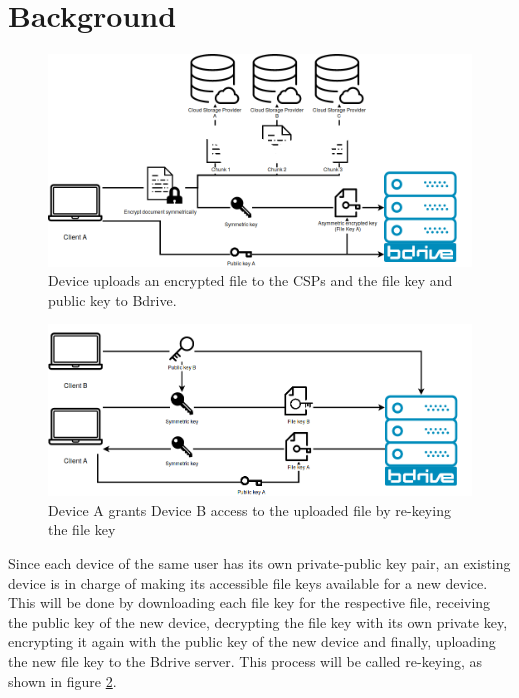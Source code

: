 \section{Background}
\label{sec:background}
\begin{figure}[!ht]
\centering
    \includegraphics[width=1\linewidth]{img/bdrive1.png}\par 
    \caption{Device uploads an encrypted file to the \ac{CSP}s and the file key and public key to Bdrive.}
    \label{fig:filekey}
\end{figure}
\begin{figure}[!ht]
\centering
    \includegraphics[width=1\linewidth]{img/bdrive2.png}\par
    \caption{Device A grants Device B access to the uploaded file by re-keying the file key}
    \label{fig:rekey}
\end{figure}
Since each device of the same user has its own private-public key pair, an existing device is in charge of making its accessible file keys available for a new device. This will be done by downloading each file key for the respective file, receiving the public key of the new device, decrypting the file key with its own private key, encrypting it again with the public key of the new device and finally, uploading the new file key to the Bdrive server. This process will be called re-keying, as shown in figure \ref{fig:rekey}. 

